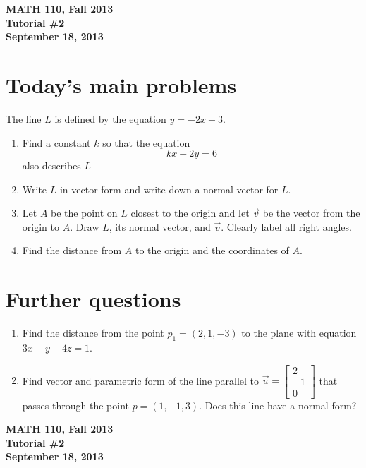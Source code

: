 \documentclass[11pt]{exam}
\newcommand{\mat}[1]{\begin{bmatrix}#1\end{bmatrix}}
\newcommand{\mthCourse}{MATH 110}
\newcommand{\mthTerm}{Fall 2013}
\newcommand{\mthTutorialNumber}{2}
\newcommand{\mthDate}{September 18, 2013}
\begin{document}
{\large
	\begin{center}
		{\bf \mthCourse, \mthTerm}\\ 
		{\bf Tutorial \#\mthTutorialNumber}\\
		{\bf \mthDate}
	\end{center}
}

\section*{Today's main problems}

The line $L$ is defined by the equation $y=-2x+3$.  
\begin{enumerate}
	\item Find a constant $k$ so that the equation
	\[
		kx+2y=6
	\]
	also describes $L$
	\item Write $L$ in vector form and write down a normal vector for $L$.
	\item Let $A$ be the point on $L$ closest to the origin and let $\vec v$
		be the vector from the origin to $A$. 
	Draw $L$, its normal vector, and $\vec v$. 
	Clearly label all right angles.
	\item Find the distance from $A$ to the origin and the coordinates of $A$.
\end{enumerate}


\section*{Further questions}

\begin{enumerate}[resume]
	\item  Find the distance from the point $p_1=(2,1,-3)$ to
	the plane with equation $3x-y+4z=1$.

	\item Find vector and parametric form of the line parallel to
	$\vec u=\mat{2\\-1\\0}$ that passes through the point $p=(1,-1,3)$.
	Does this line have a normal form?
\end{enumerate}

\newpage
{
	\begin{center}
		{\bf \mthCourse, \mthTerm}\\ 
		{\bf Tutorial \#\mthTutorialNumber}\\
		{\bf \mthDate}
	\end{center}
}
\end{document}
